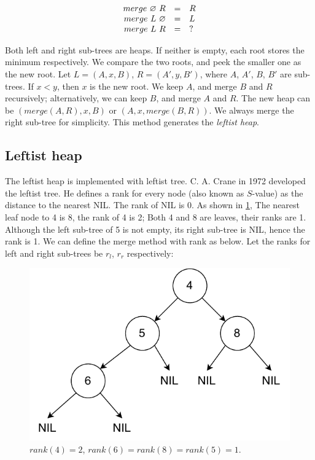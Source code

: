\documentclass[b5paper]{article}
\begin{document}
\[
\begin{array}{rcl}
merge\ \varnothing\ R & = & R \\
merge\ L\ \varnothing & = & L \\
merge\ L\ R & = & ? \\
\end{array}
\]

Both left and right sub-trees are heaps. If neither is empty, each root stores the minimum respectively. We compare the two roots, and peek the smaller one as the new root. Let $L = (A, x, B)$, $R = (A', y, B')$, where $A$, $A'$, $B$, $B'$ are sub-trees. If $x < y$, then $x$ is the new root. We keep $A$, and merge $B$ and $R$ recursively; alternatively, we can keep $B$, and merge $A$ and $R$. The new heap can be $(merge(A, R), x, B)$ or $(A, x, merge(B, R))$. We always merge the right sub-tree for simplicity. This method generates the {\em leftist heap}.

\subsection{Leftist heap}
  

The leftist heap is implemented with leftist tree. C. A. Crane in 1972\cite{wiki-leftist-tree} developed the leftist tree. He defines a rank for every node (also known as $S$-value) as the distance to the nearest NIL. The rank of NIL is 0. As shown in \cref{fig:rank}, The nearest leaf node to 4 is 8, the rank of 4 is 2; Both 4 and 8 are leaves, their ranks are 1. Although the left sub-tree of 5 is not empty, its right sub-tree is NIL, hence the rank is 1. We can define the merge method with rank as below. Let the ranks for left and right sub-trees be $r_l$, $r_r$ respectively:

\begin{figure}[htbp]
  \centering
  \includegraphics[scale=0.6]{img/rank}
  \caption{$rank(4) = 2$, $rank(6) = rank(8) = rank(5) = 1$.}
  \label{fig:rank}
\end{figure}
\end{document}
